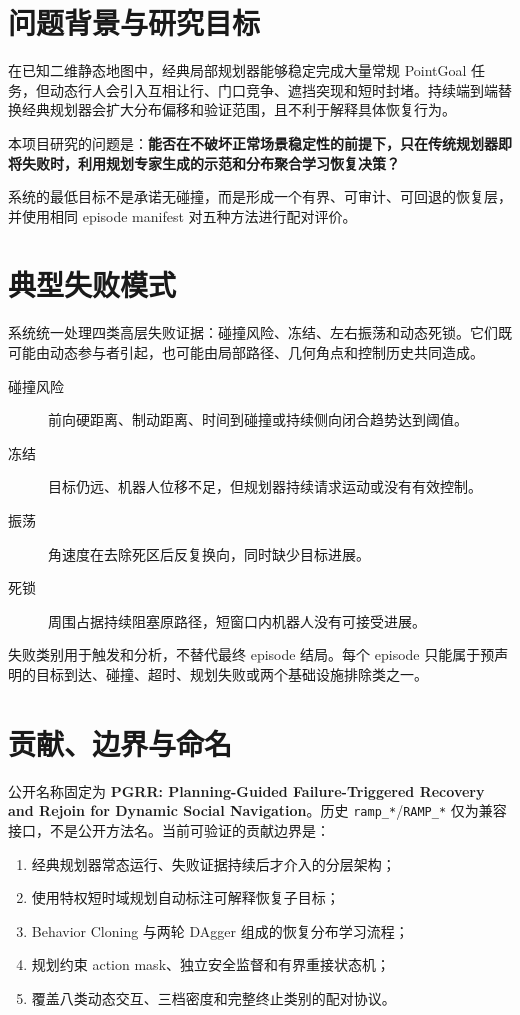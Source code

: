 \documentclass[11pt,a4paper]{article}
\begin{document}
\clearpage
\tableofcontents
\clearpage
\listoffigures
\listoftables

\clearpage
\section{问题背景与研究目标}
在已知二维静态地图中，经典局部规划器能够稳定完成大量常规 PointGoal 任务，但动态行人会引入互相让行、门口竞争、遮挡突现和短时封堵。持续端到端替换经典规划器会扩大分布偏移和验证范围，且不利于解释具体恢复行为。

本项目研究的问题是：\textbf{能否在不破坏正常场景稳定性的前提下，只在传统规划器即将失败时，利用规划专家生成的示范和分布聚合学习恢复决策？}

系统的最低目标不是承诺无碰撞，而是形成一个有界、可审计、可回退的恢复层，并使用相同 episode manifest 对五种方法进行配对评价。

\section{典型失败模式}
系统统一处理四类高层失败证据：碰撞风险、冻结、左右振荡和动态死锁。它们既可能由动态参与者引起，也可能由局部路径、几何角点和控制历史共同造成。

\begin{description}
  \item[碰撞风险] 前向硬距离、制动距离、时间到碰撞或持续侧向闭合趋势达到阈值。
  \item[冻结] 目标仍远、机器人位移不足，但规划器持续请求运动或没有有效控制。
  \item[振荡] 角速度在去除死区后反复换向，同时缺少目标进展。
  \item[死锁] 周围占据持续阻塞原路径，短窗口内机器人没有可接受进展。
\end{description}

失败类别用于触发和分析，不替代最终 episode 结局。每个 episode 只能属于预声明的目标到达、碰撞、超时、规划失败或两个基础设施排除类之一。

\clearpage
\section{贡献、边界与命名}
公开名称固定为 \textbf{PGRR: Planning-Guided Failure-Triggered Recovery and Rejoin for Dynamic Social Navigation}。历史 \texttt{ramp\_*}/\texttt{RAMP\_*} 仅为兼容接口，不是公开方法名。当前可验证的贡献边界是：

\begin{enumerate}
  \item 经典规划器常态运行、失败证据持续后才介入的分层架构；
  \item 使用特权短时域规划自动标注可解释恢复子目标；
  \item Behavior Cloning 与两轮 DAgger 组成的恢复分布学习流程；
  \item 规划约束 action mask、独立安全监督和有界重接状态机；
  \item 覆盖八类动态交互、三档密度和完整终止类别的配对协议。
\end{enumerate}
\end{document}
